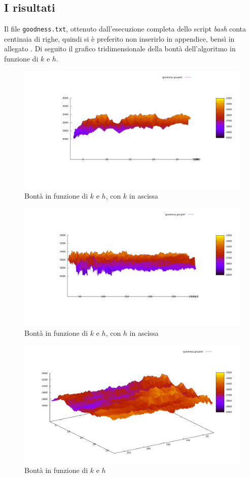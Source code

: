 \documentclass[12pt,a4paper]{article}
\theoremstyle{thm}
\theoremstyle{def}
\begin{document}

\subsection{I risultati}
Il file \texttt{goodness.txt}, ottenuto dall'esecuzione completa dello script \textit{bash} conta centinaia di righe, quindi si è preferito non inserirlo in appendice, bensì in allegato . Di seguito il grafico tridimensionale della bontà dell'algoritmo in funzione di $k$ e $h$.



\begin{figure}[htp]
\includegraphics[scale=0.4]{k.pdf}
\caption{Bontà in funzione di $k$ e $h$, con $k$ in ascissa}
\end{figure}

\begin{figure}
\includegraphics[scale=0.4]{h.pdf}
\caption{Bontà in funzione di $k$ e $h$, con $h$ in ascissa}
\end{figure}

\begin{figure}
\includegraphics[scale=0.4]{3.pdf}
\caption{Bontà in funzione di $k$ e $h$}
\end{figure}
\end{document}
